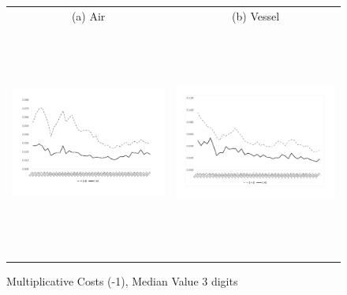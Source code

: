 \documentclass[a4paper,11pt]{article}
\begin{document}
\begin{figure}[htbp]
\caption{Multiplicative Costs (-1), Median Value 3 digits}\label{fig:good_fit}
\begin{center}
\begin{tabular}{cc}
{\small (a) Air } & {\small (b) Vessel}\\
\includegraphics[width=3.5in, height=3in]{graph1a.pdf}
& \includegraphics[width=3.5in,height=3in]{graph1b.pdf} \\
\end{tabular}
\end{center}
\end{figure}
\end{document}
